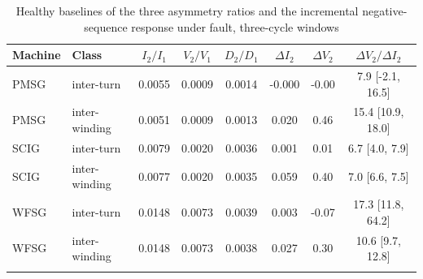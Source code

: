 \begin{table}[t]
\tabsize
\setlength{\tabcolsep}{3pt}
\caption{Healthy baselines of the three asymmetry ratios and the incremental negative-sequence response under fault, three-cycle windows}\label{tab:z2}
\begin{tabular}{@{}llcccccc@{}}
\toprule
Machine & Class & $I_2/I_1$ & $V_2/V_1$ & $D_2/D_1$ & $\Delta I_2$ & $\Delta V_2$ & $\Delta V_2/\Delta I_2$ \\
\midrule
PMSG & inter-turn & 0.0055 & 0.0009 & 0.0014 & -0.000 & -0.00 & 7.9 [-2.1, 16.5] \\
PMSG & inter-winding & 0.0051 & 0.0009 & 0.0013 & 0.020 & 0.46 & 15.4 [10.9, 18.0] \\
SCIG & inter-turn & 0.0079 & 0.0020 & 0.0036 & 0.001 & 0.01 & 6.7 [4.0, 7.9] \\
SCIG & inter-winding & 0.0077 & 0.0020 & 0.0035 & 0.059 & 0.40 & 7.0 [6.6, 7.5] \\
WFSG & inter-turn & 0.0148 & 0.0073 & 0.0039 & 0.003 & -0.07 & 17.3 [11.8, 64.2] \\
WFSG & inter-winding & 0.0148 & 0.0073 & 0.0038 & 0.027 & 0.30 & 10.6 [9.7, 12.8] \\
\botrule
\end{tabular}
\end{table}
